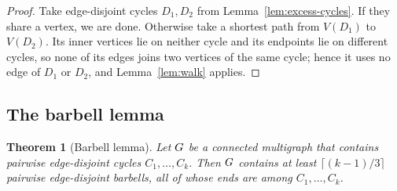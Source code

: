 \documentclass[11pt,a4paper]{article}
\newtheorem{theorem}{Theorem}[section]
\theoremstyle{definition}
\theoremstyle{remark}
\theoremstyle{plain}
\theoremstyle{definition}
\begin{document}
\begin{proof}
Take edge-disjoint cycles \(D_1,D_2\) from Lemma~\ref{lem:excess-cycles}. If
they share a vertex, we are done. Otherwise take a shortest path from
\(V(D_1)\) to \(V(D_2)\). Its inner vertices lie on neither cycle and its
endpoints lie on different cycles, so none of its edges joins two vertices of
the same cycle; hence it uses no edge of \(D_1\) or \(D_2\), and
Lemma~\ref{lem:walk} applies.
\end{proof}

\subsection{The barbell lemma}

\begin{theorem}[Barbell lemma]\label{thm:barbell}
Let \(G\) be a connected multigraph that contains pairwise edge-disjoint
cycles \(C_1,\dots,C_k\). Then \(G\) contains at least
\(\lceil(k-1)/3\rceil\) pairwise edge-disjoint barbells, all of whose ends are
among \(C_1,\dots,C_k\).
\end{theorem}
\end{document}
